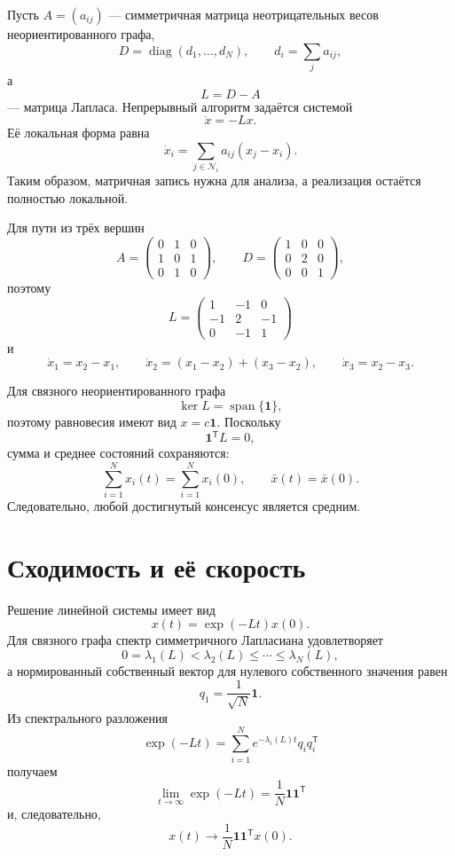 Пусть \(A=(a_{ij})\) --- симметричная матрица неотрицательных весов
неориентированного графа,
\[
    D=\operatorname{diag}(d_1,\ldots,d_N),
    \qquad
    d_i=\sum_ja_{ij},
\]
а
\[
    L=D-A
\]
--- матрица Лапласа. Непрерывный алгоритм задаётся системой
\[
    \dot x=-Lx.
\]
Её локальная форма равна
\[
    \dot x_i
    =
    \sum_{j\in\mathcal N_i}a_{ij}(x_j-x_i).
\]
Таким образом, матричная запись нужна для анализа, а реализация
остаётся полностью локальной.

Для пути из трёх вершин
\[
    A=
    \begin{pmatrix}
        0&1&0\\
        1&0&1\\
        0&1&0
    \end{pmatrix},
    \qquad
    D=
    \begin{pmatrix}
        1&0&0\\
        0&2&0\\
        0&0&1
    \end{pmatrix},
\]
поэтому
\[
    L=
    \begin{pmatrix}
        1&-1&0\\
        -1&2&-1\\
        0&-1&1
    \end{pmatrix}
\]
и
\[
    \dot x_1=x_2-x_1,
    \qquad
    \dot x_2=(x_1-x_2)+(x_3-x_2),
    \qquad
    \dot x_3=x_2-x_3.
\]

Для связного неориентированного графа
\[
    \ker L=\operatorname{span}\{\mathbf1\},
\]
поэтому равновесия имеют вид \(x=c\mathbf1\). Поскольку
\[
    \mathbf1^{\mathsf T}L=0,
\]
сумма и среднее состояний сохраняются:
\[
    \sum_{i=1}^{N}x_i(t)
    =
    \sum_{i=1}^{N}x_i(0),
    \qquad
    \bar x(t)=\bar x(0).
\]
Следовательно, любой достигнутый консенсус является средним.

\section{Сходимость и её скорость}

Решение линейной системы имеет вид
\[
    x(t)=\exp(-Lt)x(0).
\]
Для связного графа спектр симметричного Лапласиана удовлетворяет
\[
    0=\lambda_1(L)
    <
    \lambda_2(L)
    \le\cdots\le
    \lambda_N(L),
\]
а нормированный собственный вектор для нулевого собственного значения
равен
\[
    q_1=\frac1{\sqrt N}\mathbf1.
\]
Из спектрального разложения
\[
    \exp(-Lt)
    =
    \sum_{i=1}^{N}
    e^{-\lambda_i(L)t}q_iq_i^{\mathsf T}
\]
получаем
\[
    \lim_{t\to\infty}\exp(-Lt)
    =
    \frac1N\mathbf1\mathbf1^{\mathsf T}
\]
и, следовательно,
\[
    x(t)
    \longrightarrow
    \frac1N\mathbf1\mathbf1^{\mathsf T}x(0).
\]

